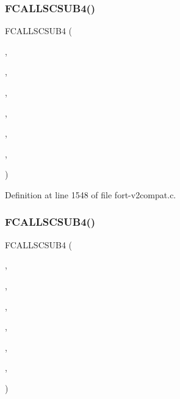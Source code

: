 \subsubsection{\texorpdfstring{F\+C\+A\+L\+L\+S\+C\+S\+U\+B4()}{FCALLSCSUB4()}\hspace{0.1cm}{\footnotesize\ttfamily [2/3]}}
{\footnotesize\ttfamily F\+C\+A\+L\+L\+S\+C\+S\+U\+B4 (\begin{DoxyParamCaption}\item[{\hyperlink{nf__v2compat_8c_a3f3248eb07164659e5e4abcd5cf336d1}{c\+\_\+ncvren}}]{,  }\item[{N\+C\+V\+R\+EN}]{,  }\item[{\hyperlink{nf__fortv2_8f90_a8de81d99a1275d61dabb79e14a84c1f6}{ncvren}}]{,  }\item[{N\+C\+ID}]{,  }\item[{V\+A\+R\+ID}]{,  }\item[{S\+T\+R\+I\+NG}]{,  }\item[{\hyperlink{fort-v2compat_8c_ae2352f39cbd25bcaf1bedbbb12db73fe}{P\+R\+C\+O\+DE}}]{ }\end{DoxyParamCaption})}



Definition at line 1548 of file fort-\/v2compat.\+c.

\mbox{\label{fort-v2compat_8c_ac6de05a02619ce68727ecc66fcc1bd1d}} 
\subsubsection{\texorpdfstring{F\+C\+A\+L\+L\+S\+C\+S\+U\+B4()}{FCALLSCSUB4()}\hspace{0.1cm}{\footnotesize\ttfamily [3/3]}}
{\footnotesize\ttfamily F\+C\+A\+L\+L\+S\+C\+S\+U\+B4 (\begin{DoxyParamCaption}\item[{\hyperlink{nf__v2compat_8c_a7bd0c5f885c4efae5a33518503d4b5df}{c\+\_\+ncadel}}]{,  }\item[{N\+C\+A\+D\+EL}]{,  }\item[{\hyperlink{nf__fortv2_8f90_aca410e210247338c8c44f4cd02aacdec}{ncadel}}]{,  }\item[{N\+C\+ID}]{,  }\item[{V\+A\+R\+ID}]{,  }\item[{S\+T\+R\+I\+NG}]{,  }\item[{\hyperlink{fort-v2compat_8c_ae2352f39cbd25bcaf1bedbbb12db73fe}{P\+R\+C\+O\+DE}}]{ }\end{DoxyParamCaption})}



